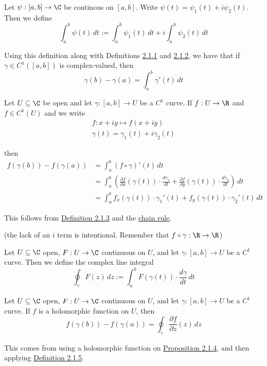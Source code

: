 \label{c511702}

Let $\psi:[a,b]\to\C$ be continous on $[a,b]$. Write
$\psi(t)=\psi_1(t)+i\psi_2(t)$. Then we define
$$
	\int_a^b\psi(t)\,dt:=\int_a^b\psi_1(t)\,dt+i\int_a^b\psi_2(t)\,dt
$$

Using this definition along with Definitions \href{c1f6d35}{2.1.1}
and \href{e4132bc}{2.1.2}, we have that if $\gamma\in C^1([a,b])$
is complex-valued, then
$$
	\gamma(b)-\gamma(a)=\int_a^b\gamma'(t)\,dt
$$

\label{f37b676}

Let $U\subseteq\C$ be open and let $\gamma:[a,b]\to U$ be a $C^1$
curve. If $f:U\to\R$ and $f\in C^1(U)$ and we write
\begin{gather*}
	f:x+iy\mapsto f(x+iy) \\
	\gamma(t)=\gamma_1(t)+i\gamma_2(t)
\end{gather*}

then
\begin{align*}
	f(\gamma(b))-f(\gamma(a))
	 & =\int_a^b (f\circ\gamma)'(t)\,dt \\
	 & =\int_a^b\left(
	\frac{\partial f}{\partial x}(\gamma(t))\cdot\frac{d\gamma_1}{dt}+
	\frac{\partial f}{\partial y}(\gamma(t))\cdot\frac{d\gamma_2}{dt}
	\right)\,dt                         \\
	 & =\int_a^b
	f_x(\gamma(t))\cdot\gamma_1'(t)+f_y(\gamma(t))\cdot\gamma_2'(t)
	\,dt
\end{align*}

This follows from \href{c511702}{Definition 2.1.3} and the
\href{d969d46}{chain rule}.

(the lack of an $i$ term is intentional. Remember that
$f\circ\gamma:\R\to\R$)

\label{b1e96fc}

Let $U\subseteq\C$ open, $F:U\to\C$ continuous on $U$, and let
$\gamma:[a,b]\to U$ be a $C^1$ curve. Then we define the complex line
integral
$$
	\oint_\gamma F(z)\,dz:=\int_a^bF(\gamma(t))\cdot\frac{d\gamma}{dt}\,dt
$$

\label{c526c09}

Let $U\subseteq\C$ open, $F:U\to\C$ continuous on $U$, and let
$\gamma:[a,b]\to U$ be a $C^1$ curve. If $f$ is a holomorphic function
on $U$, then
$$
	f(\gamma(b))-f(\gamma(a))=\oint_\gamma\frac{\partial f}{\partial z}(z)\,dz
$$

This comes from using a holomorphic function on
\href{f37b676}{Proposition 2.1.4}, and then applying
\href{b1e96fc}{Definition 2.1.5}.

